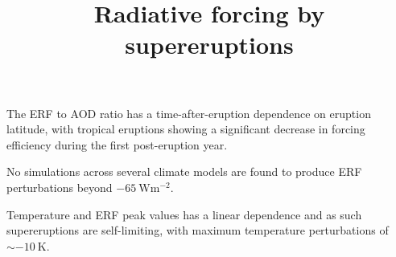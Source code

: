 \documentclass[draft]{agujournal2019}
\begin{document}
   


  \title{Radiative forcing by supereruptions}





  \begin{keypoints}
    \item
    The ERF to AOD ratio has a time-after-eruption dependence on eruption latitude, with
    tropical eruptions showing a significant decrease in forcing efficiency during the
    first post-eruption year.
    \item
    No simulations across several climate models are found to produce ERF perturbations
    beyond \(\SI{-65}{\watt\meter^{-2}}\).
    \item
    Temperature and ERF peak values has a linear dependence and as such supereruptions
    are self-limiting, with maximum temperature perturbations of \(\sim
    \SI{-10}{\kelvin}\).

  \end{keypoints}
\end{document}
